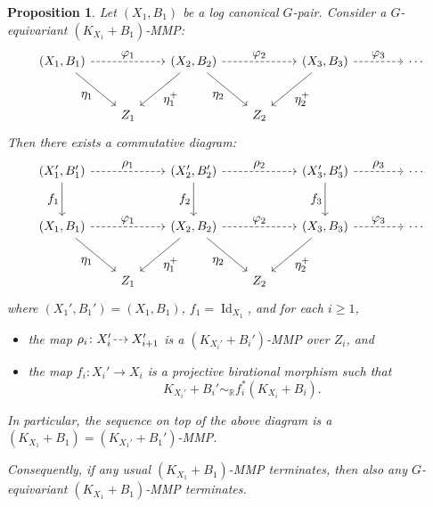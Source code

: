 \documentclass[JEP,XML,SOM,Unicode,published]{cedram}
\let\ts\textstyle
\newcommand{\dradpl}{{\hspace*{-2.5mm}\begin{tikzcd}[ampersand replacement=\&,column sep = scriptsize]\mbox{}\ar[r,dashed]\&\mbox{}\end{tikzcd}\hspace*{-2.5mm}}}
\newcommand{\dratst}{{\hspace*{-2.5mm}\begin{tikzcd}[ampersand replacement=\&,column sep = small]\mbox{}\ar[r,dashed]\&\mbox{}\end{tikzcd}\hspace*{-2mm}}}
\let\drascst\dratst
\newcommand{\dra}{\mathchoice{\dradpl}{\dratst}{\drascst}{\drascst}}
\theoremstyle{plain}
\newtheorem{prop}[thm]{Proposition}
\theoremstyle{definition}
\newcommand{\R}{\mathbb{R}}
\DeclareMathOperator{\Id}{Id}
\begin{document}
\begin{prop}
\label{prop:G-equivariant_termination}
Let $(X_1,B_1)$ be a log canonical $G$\nobreakdash-pair. Consider a $G$\nobreakdash-equivariant $(K_{X_1}+B_1)$-MMP:
\[
\begin{tikzcd}[column sep = 2em, row sep = large]
(X_1,B_1) \arrow[dr, "\ts \eta_1" swap] \arrow[rr, dashed, "\ts \varphi_1"] && (X_2,B_2) \arrow[dl, "\ts \eta_1^+"] \arrow[dr, "\ts \eta_2" swap] \arrow[rr, dashed, "\ts \varphi_2"] && (X_3,B_3) \arrow[dl, "\ts \eta_2^+"] \arrow[rr, dashed, "\ts \varphi_3"] && \cdots \\
& Z_1 && Z_2
\end{tikzcd}
\]
Then there exists a commutative diagram:
\[
\begin{tikzcd}[column sep = 2em, row sep = large]
(X_1',B_1') \arrow[d, "\ts f_1" swap] \arrow[rr, dashed, "\ts \rho_1"] && (X_2',B_2') \arrow[d, "\ts f_2" swap] \arrow[rr, dashed, "\ts \rho_2"] && (X_3',B_3') \arrow[d, "\ts f_3" swap] \arrow[rr, dashed, "\ts \rho_3"] && \cdots
\\
(X_1,B_1) \arrow[dr, "\ts \eta_1" swap] \arrow[rr, dashed, "\ts \varphi_1"] && (X_2,B_2) \arrow[dl, "\ts \eta_1^+"] \arrow[dr, "\ts \eta_2" swap] \arrow[rr, dashed, "\ts \varphi_2"] && (X_3,B_3) \arrow[dl, "\ts \eta_2^+"] \arrow[rr, dashed, "\ts \varphi_3"] && \cdots
\\
& Z_1 && Z_2
\end{tikzcd}
\]
where $(X_1',B_1') = (X_1,B_1)$, $f_1 = \Id_{X_1}$, and for each $i \geq 1$,
\begin{itemize}
\item
the map $ \rho_i \colon X_i' \dra X_{i+1}' $ is a $(K_{X_i'}+B_i')$-MMP over $ Z_i $, and

\item
the map $f_i \colon X_i' \to X_i$ is a projective birational morphism such that
\[
K_{X_i'} + B_i' \sim_\R f_i^* (K_{X_i} + B_i).
\]
\end{itemize}
In particular, the sequence on top of the above diagram is a $(K_{X_1} + B_1) = (K_{X_1'} + B_1')$-MMP.

Consequently, if any usual $(K_{X_1}+B_1)$-MMP terminates, then also any $G$\nobreakdash-equi\-variant $(K_{X_1}+B_1)$-MMP terminates.
\end{prop}
\end{document}
